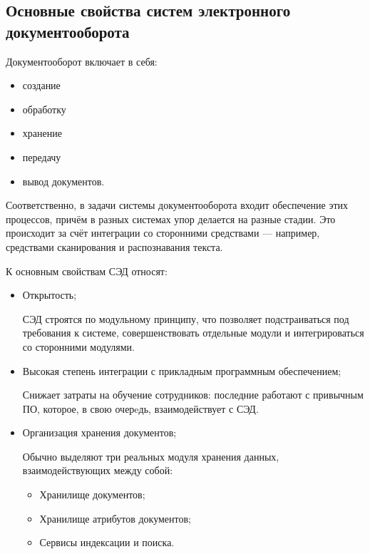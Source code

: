 \subsection{Основные свойства систем электронного документооборота} \label{review_common}

Документооборот включает в себя:
\begin{itemize}
	\item создание
	\item обработку
	\item хранение
	\item передачу
	\item вывод документов.
\end{itemize}

Соответственно, в задачи системы документооборота входит обеспечение этих процессов, причём в разных системах упор делается на разные стадии. Это происходит за счёт интеграции со сторонними средствами --- например, средствами сканирования и распознавания текста.

\vspace{\baselineskip}
К основным свойствам СЭД относят:
\begin{itemize}
	\item Открытость;
		
	СЭД строятся по модульному принципу, что позволяет подстраиваться под требования к системе, совершенствовать отдельные модули и интегрироваться со сторонними модулями.
	\item Высокая степень интеграции с прикладным программным обеспечением;

	Снижает затраты на обучение сотрудников: последние работают с привычным ПО, которое, в свою очерeдь, взаимодействует с СЭД.
	\item Организация хранения документов;

	Обычно выделяют три реальных модуля хранения данных, взаимодействующих между собой:
	\begin{itemize}
		\item Хранилище документов;
		\item Хранилище атрибутов документов;
		\item Сервисы индексации и поиска.
	\end{itemize}
\end{itemize}

